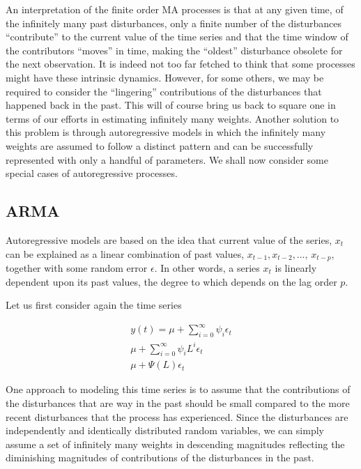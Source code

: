 \documentclass[
  11pt,
]{article}
\numberwithin{equation}{section}
\begin{document}
An interpretation of the finite order MA processes is that at any given
time, of the infinitely many past disturbances, only a finite number of
the disturbances ``contribute'' to the current value of the time series
and that the time window of the contributors ``moves'' in time, making
the ``oldest'' disturbance obsolete for the next observation. It is
indeed not too far fetched to think that some processes might have these
intrinsic dynamics. However, for some others, we may be required to
consider the ``lingering'' contributions of the disturbances that
happened back in the past. This will of course bring us back to square
one in terms of our efforts in estimating infinitely many weights.
Another solution to this problem is through autoregressive models in
which the infinitely many weights are assumed to follow a distinct
pattern and can be successfully represented with only a handful of
parameters. We shall now consider some special cases of autoregressive
processes.

\hypertarget{arma}{%
\subsection{ARMA}\label{arma}}

Autoregressive models are based on the idea that current value of the
series, \(x_{t}\) can be explained as a linear combination of past
values, \(x_{t-1}, x_{t-2}, \ldots, \, x_{t-p}\), together with some
random error \(\epsilon\). In other words, a series \(x_{t}\) is
linearly dependent upon its past values, the degree to which depends on
the lag order \(p\).

Let us first consider again the time series

\begin{gather*}
y(t) = \mu + \sum\limits_{i= 0}^{\infty}\psi_{i}\epsilon_{t} \\[8pt]
\mu + \sum\limits_{i=0}^{\infty}\psi_{i}L^{i}\epsilon_{t} \\[8pt]
\mu + \Psi(L)\epsilon_{t}
\end{gather*}

One approach to modeling this time series is to assume that the
contributions of the disturbances that are way in the past should be
small compared to the more recent disturbances that the process has
experienced. Since the disturbances are independently and identically
distributed random variables, we can simply assume a set of infinitely
many weights in descending magnitudes reflecting the diminishing
magnitudes of contributions of the disturbances in the past.
\end{document}
